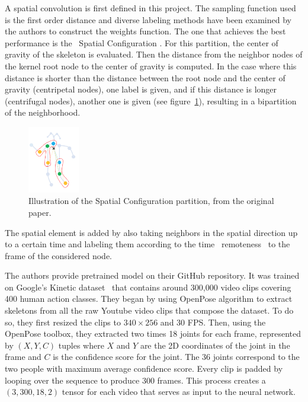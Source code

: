 \documentclass[12pt,a4paper,twoside]{article}
\begin{document}
A spatial convolution is first defined in this project. The sampling function used is the first order distance and diverse labeling methods have been examined by the authors to construct the weights function. The one that achieves the best performance is the \guillemotleft~Spatial Configuration \guillemotright. For this partition, the center of gravity of the skeleton is evaluated. Then the distance from the neighbor nodes of the kernel root node to the center of gravity is computed. In the case where this distance is shorter than the distance between the root node and the center of gravity (centripetal nodes), one label is given, and if this distance is longer (centrifugal nodes), another one is given (see figure~\ref{fig:partition_strat}), resulting in a bipartition of the neighborhood.

\begin{figure}
    \centering
        \includegraphics[width=0.2\textwidth]{images/partition_strat}
    \caption{Illustration of the Spatial Configuration partition, from the original paper.}
\label{fig:partition_strat}
\end{figure}

The spatial element is added by also taking neighbors in the spatial direction up to a certain time and labeling them according to the time \guillemotleft~remoteness \guillemotright~to the frame of the considered node.

The authors provide pretrained model on their GitHub repository. It was trained on Google's Kinetic dataset~\cite{Kay2017} that contains around 300,000 video clips covering 400 human action classes. They began by using OpenPose algorithm to extract skeletons from all the raw Youtube video clips that compose the dataset. To do so, they first resized the clips to $340 \times 256$ and $30$ FPS. Then, using the OpenPose toolbox, they extracted two times 18 joints for each frame, represented by $(X,Y,C)$ tuples where $X$ and $Y$ are the 2D coordinates of the joint in the frame and $C$ is the confidence score for the joint. The 36 joints correspond to the two people with maximum average confidence score. Every clip is padded by looping over the sequence to produce 300 frames. This process creates a $(3, 300, 18, 2)$ tensor for each video that serves as input to the neural network. 
\end{document}
